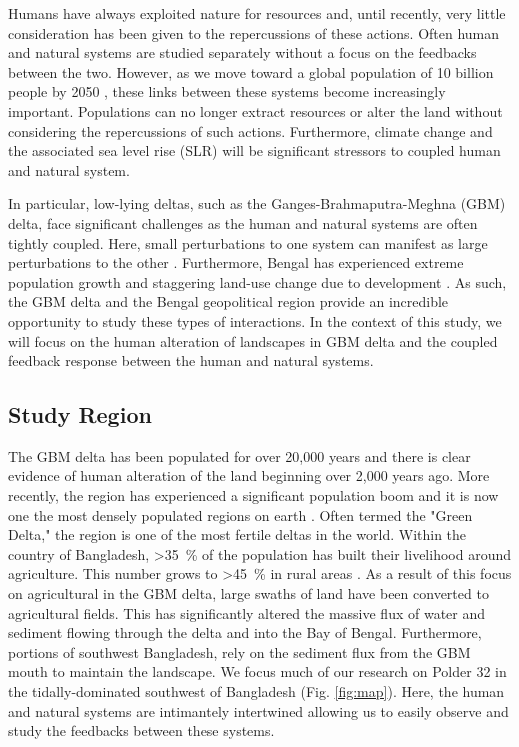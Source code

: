 \documentclass{wscpaperproc}
\theoremstyle{wsc}
\begin{document}
Humans have always exploited nature for resources and, until recently, very little consideration has been given to the repercussions of these actions. Often human and natural systems are studied separately without a focus on the feedbacks between the two. However, as we move toward a global population of 10 billion people by 2050 \cite{unitednationsWorldPopulationProspects2017}, these links between these systems become increasingly important. Populations can no longer extract resources or alter the land without considering the repercussions of such actions. Furthermore, climate change and the associated sea level rise (SLR) will be significant stressors to coupled human and natural system.

In particular, low-lying deltas, such as the Ganges-Brahmaputra-Meghna (GBM) delta, face significant challenges as the human and natural systems are often tightly coupled. Here, small perturbations to one system can manifest as large perturbations to the other \cite{hoegh-guldbergImpacts5CGlobal2018}. Furthermore, Bengal has experienced extreme population growth and staggering land-use change due to development \cite{unitednationsWorldPopulationProspects2017}. As such, the GBM delta and the Bengal geopolitical region provide an incredible opportunity to study these types of interactions. In the context of this study, we will focus on the human alteration of landscapes in GBM delta and the coupled feedback response between the human and natural systems.

\subsection{Study Region}

The GBM delta has been populated for over 20,000 years and there is clear evidence of human alteration of the land beginning over 2,000 years ago. More recently, the region has experienced a significant population boom and it is now one the most densely populated regions on earth \cite{bangladeshbureauofstatistics2011PopulationHousing2011}. Often termed the "Green Delta," the region is one of the most fertile deltas in the world. Within the country of Bangladesh, \SI{>35}{\percent} of the population has built their livelihood around agriculture. This number grows to \SI{>45}{\percent} in rural areas \cite{bangladeshbureauofstatisticsReportHouseholdIncome2010}. As a result of this focus on agricultural in the GBM delta, large swaths of land have been converted to agricultural fields. This has significantly altered the massive flux of water and sediment flowing through the delta and into the Bay of Bengal. Furthermore, portions of southwest Bangladesh, rely on the sediment flux from the GBM mouth to maintain the landscape. We focus much of our research on Polder 32 in the tidally-dominated southwest of Bangladesh (Fig. \ref{fig:map}). Here, the human and natural systems are intimantely intertwined allowing us to easily observe and study the feedbacks between these systems. 
\end{document}
